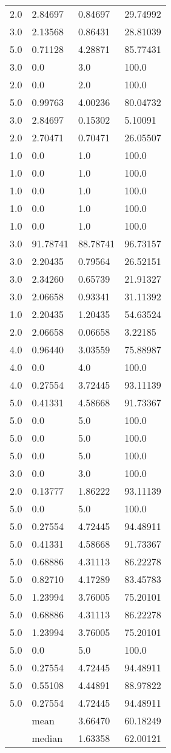 \begin{longtable}{llll}
	2.0 & 2.84697 & 0.84697 & 29.74992 \\
	3.0 & 2.13568 & 0.86431 & 28.81039 \\
	5.0 & 0.71128 & 4.28871 & 85.77431 \\
	3.0 & 0.0 & 3.0 & 100.0 \\
	2.0 & 0.0 & 2.0 & 100.0 \\
	5.0 & 0.99763 & 4.00236 & 80.04732 \\
	3.0 & 2.84697 & 0.15302 & 5.10091 \\
	2.0 & 2.70471 & 0.70471 & 26.05507 \\
	1.0 & 0.0 & 1.0 & 100.0 \\
	1.0 & 0.0 & 1.0 & 100.0 \\
	1.0 & 0.0 & 1.0 & 100.0 \\
	1.0 & 0.0 & 1.0 & 100.0 \\
	1.0 & 0.0 & 1.0 & 100.0 \\
	3.0 & 91.78741 & 88.78741 & 96.73157 \\
	3.0 & 2.20435 & 0.79564 & 26.52151 \\
	3.0 & 2.34260 & 0.65739 & 21.91327 \\
	3.0 & 2.06658 & 0.93341 & 31.11392 \\
	1.0 & 2.20435 & 1.20435 & 54.63524 \\
	2.0 & 2.06658 & 0.06658 & 3.22185 \\
	4.0 & 0.96440 & 3.03559 & 75.88987 \\
	4.0 & 0.0 & 4.0 & 100.0 \\
	4.0 & 0.27554 & 3.72445 & 93.11139 \\
	5.0 & 0.41331 & 4.58668 & 91.73367 \\
	5.0 & 0.0 & 5.0 & 100.0 \\
	5.0 & 0.0 & 5.0 & 100.0 \\
	5.0 & 0.0 & 5.0 & 100.0 \\
	3.0 & 0.0 & 3.0 & 100.0 \\
	2.0 & 0.13777 & 1.86222 & 93.11139 \\
	5.0 & 0.0 & 5.0 & 100.0 \\
	5.0 & 0.27554 & 4.72445 & 94.48911 \\
	5.0 & 0.41331 & 4.58668 & 91.73367 \\
	5.0 & 0.68886 & 4.31113 & 86.22278 \\
	5.0 & 0.82710 & 4.17289 & 83.45783 \\
	5.0 & 1.23994 & 3.76005 & 75.20101 \\
	5.0 & 0.68886 & 4.31113 & 86.22278 \\
	5.0 & 1.23994 & 3.76005 & 75.20101 \\
	5.0 & 0.0 & 5.0 & 100.0 \\
	5.0 & 0.27554 & 4.72445 & 94.48911 \\
	5.0 & 0.55108 & 4.44891 & 88.97822 \\
	5.0 & 0.27554 & 4.72445 & 94.48911 \\ \hline
	& mean & 3.66470 & 60.18249 \\ \hline
  & median & 1.63358 & 62.00121
\end{longtable}
